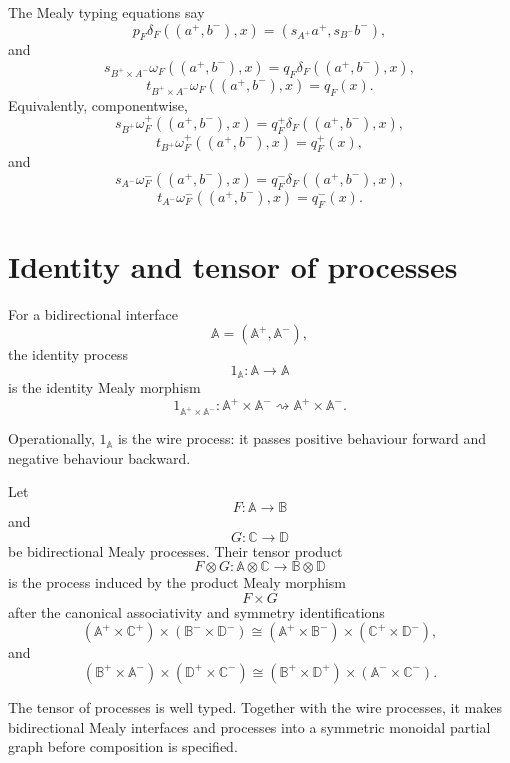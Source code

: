 The Mealy typing equations say
\[
p_F\delta_F((a^+,b^-),x)
=
(s_{A^+}a^+,s_{B^-}b^-),
\]
and
\[
s_{B^+\times A^-}\omega_F((a^+,b^-),x)
=
q_F\delta_F((a^+,b^-),x),
\]
\[
t_{B^+\times A^-}\omega_F((a^+,b^-),x)
=
q_F(x).
\]
Equivalently, componentwise,
\[
s_{B^+}\omega_F^+((a^+,b^-),x)
=
q_F^+\delta_F((a^+,b^-),x),
\]
\[
t_{B^+}\omega_F^+((a^+,b^-),x)
=
q_F^+(x),
\]
and
\[
s_{A^-}\omega_F^-((a^+,b^-),x)
=
q_F^-\delta_F((a^+,b^-),x),
\]
\[
t_{A^-}\omega_F^-((a^+,b^-),x)
=
q_F^-(x).
\]

\section{Identity and tensor of processes}
\label{sec:identity-tensor-processes}

\begin{definition}
\label{def:identity-process}
For a bidirectional interface
\[
\mathbb A=(\mathbb A^+,\mathbb A^-),
\]
the identity process
\[
1_{\mathbb A}:\mathbb A\to\mathbb A
\]
is the identity Mealy morphism
\[
1_{\mathbb A^+\times\mathbb A^-}:
\mathbb A^+\times\mathbb A^-
\rightsquigarrow
\mathbb A^+\times\mathbb A^-.
\]
\end{definition}

Operationally, \(1_{\mathbb A}\) is the wire process: it passes positive
behaviour forward and negative behaviour backward.

\begin{definition}
\label{def:tensor-processes}
Let
\[
F:\mathbb A\to\mathbb B
\]
and
\[
G:\mathbb C\to\mathbb D
\]
be bidirectional Mealy processes.  Their tensor product
\[
F\otimes G:
\mathbb A\otimes\mathbb C
\to
\mathbb B\otimes\mathbb D
\]
is the process induced by the product Mealy morphism
\[
F\times G
\]
after the canonical associativity and symmetry identifications
\[
(\mathbb A^+\times\mathbb C^+)
\times
(\mathbb B^-\times\mathbb D^-)
\cong
(\mathbb A^+\times\mathbb B^-)
\times
(\mathbb C^+\times\mathbb D^-),
\]
and
\[
(\mathbb B^+\times\mathbb A^-)
\times
(\mathbb D^+\times\mathbb C^-)
\cong
(\mathbb B^+\times\mathbb D^+)
\times
(\mathbb A^-\times\mathbb C^-).
\]
\end{definition}

\begin{proposition}
\label{prop:tensor-processes-well-typed}
The tensor of processes is well typed.  Together with the wire processes, it
makes bidirectional Mealy interfaces and processes into a symmetric monoidal
partial graph before composition is specified.
\end{proposition}

